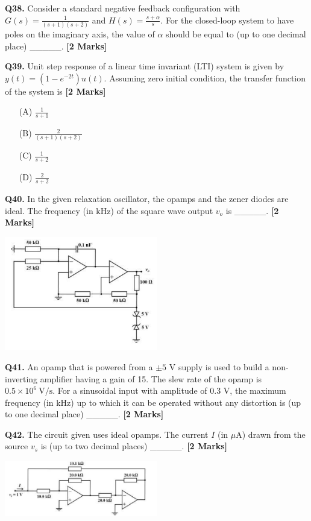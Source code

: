 \documentclass[11pt]{article}
\newcommand{\questionb}[2]{
    \noindent\textbf{Q#2.} #1 \hfill \textbf{[2 Marks]}
}
\begin{document}
\questionb{Consider a standard negative feedback configuration with \(G(s) = \frac{1}{(s+1)(s+2)}\) and \(H(s) = \frac{s + \alpha}{s}\). For the closed-loop system to have poles on the imaginary axis, the value of \(\alpha\) should be equal to (up to one decimal place) \_\_\_\_\_.}{38}
\vspace{0.5cm}

\questionb{Unit step response of a linear time invariant (LTI) system is given by \(y(t) = (1 - e^{-2t})u(t)\). Assuming zero initial condition, the transfer function of the system is}{39}
\begin{enumerate}
    \item[(A)] \(\frac{1}{s + 1}\)
    \item[(B)] \(\frac{2}{(s + 1)(s + 2)}\)
    \item[(C)] \(\frac{1}{s + 2}\)
    \item[(D)] \(\frac{2}{s + 2}\)
\end{enumerate}
\vspace{0.5cm}

\questionb{In the given relaxation oscillator, the opamps and the zener diodes are ideal. The frequency (in kHz) of the square wave output \(v_o\) is \_\_\_\_\_.}{40}
\begin{center}
\includegraphics[width=0.5\textwidth]{figures/40.png}
\end{center}
\vspace{0.5cm}

\questionb{An opamp that is powered from a \(\pm5\) V supply is used to build a non-inverting amplifier having a gain of 15. The slew rate of the opamp is \(0.5 \times 10^6\ \text{V/s}\). For a sinusoidal input with amplitude of 0.3 V, the maximum frequency (in kHz) up to which it can be operated without any distortion is (up to one decimal place) \_\_\_\_\_.}{41}
\vspace{0.5cm}

\questionb{The circuit given uses ideal opamps. The current \(I\) (in \(\mu\)A) drawn from the source \(v_s\) is (up to two decimal places) \_\_\_\_\_.}{42}
\begin{center}
\includegraphics[width=0.5\textwidth]{figures/42.png}
\end{center}
\vspace{0.5cm}
\end{document}
